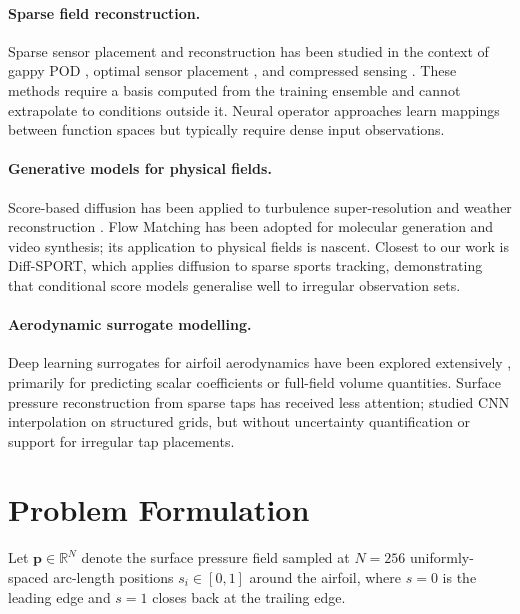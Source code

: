 \documentclass[12pt]{article}
\begin{document}
\paragraph{Sparse field reconstruction.}
Sparse sensor placement and reconstruction has been studied in the context of
gappy POD \citep{everson1995karhunen}, optimal sensor placement
\citep{manohar2018data}, and compressed sensing \citep{bai2020low}. These methods
require a basis computed from the training ensemble and cannot extrapolate to
conditions outside it. Neural operator approaches \citep{li2021fourier} learn
mappings between function spaces but typically require dense input observations.

\paragraph{Generative models for physical fields.}
Score-based diffusion has been applied to turbulence super-resolution
\citep{shu2023physics} and weather reconstruction \citep{price2023gencast}.
Flow Matching has been adopted for molecular generation and video synthesis;
its application to physical fields is nascent. Closest to our work is
Diff-SPORT, which applies diffusion to sparse sports tracking, demonstrating
that conditional score models generalise well to irregular observation sets.

\paragraph{Aerodynamic surrogate modelling.}
Deep learning surrogates for airfoil aerodynamics have been explored extensively
\citep{thuerey2020deep, bhatnagar2019prediction}, primarily for predicting scalar
coefficients or full-field volume quantities. Surface pressure reconstruction
from sparse taps has received less attention; \citet{lee2020deep} studied CNN
interpolation on structured grids, but without uncertainty quantification or
support for irregular tap placements.

\section{Problem Formulation}
\label{sec:problem}

Let $\mathbf{p} \in \mathbb{R}^N$ denote the surface pressure field sampled at
$N=256$ uniformly-spaced arc-length positions $s_i \in [0,1]$ around the airfoil,
where $s=0$ is the leading edge and $s=1$ closes back at the trailing edge.
\end{document}
